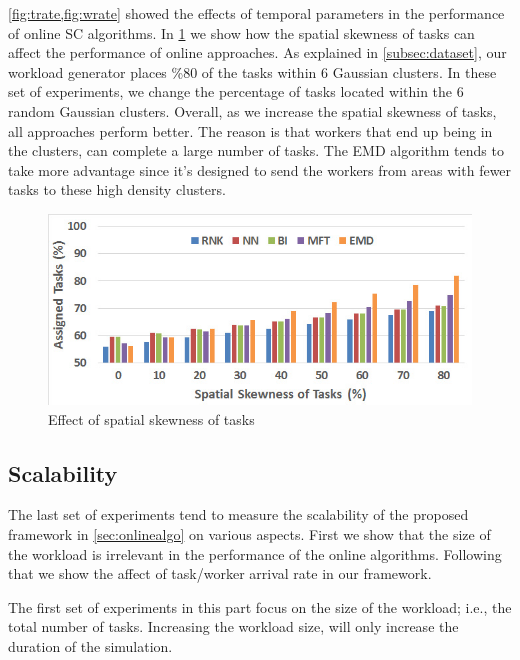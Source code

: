 \cref{fig:trate,fig:wrate} showed the effects of temporal parameters in the performance of online SC algorithms. In \cref{fig:skewness} we show how the spatial skewness of tasks can affect the performance of online approaches. As explained in \cref{subsec:dataset}, our workload generator places \%80 of the tasks within 6 Gaussian clusters. In these set of experiments, we change the percentage of tasks located within the 6 random Gaussian clusters. Overall, as we increase the spatial skewness of tasks, all approaches perform better. The reason is that workers that end up being in the clusters, can complete a large number of tasks. The EMD algorithm tends to take more advantage since it's designed to send the workers from areas with fewer tasks to these high density clusters.

\begin{figure}[h]
	\centering
	\includegraphics[width = 0.9\columnwidth]{figures/accuracy_skewness.jpg}
	\vspace{-0.1in}
	\caption{Effect of spatial skewness of tasks}\label{fig:skewness}
\end{figure}

\subsection{Scalability}
The last set of experiments tend to measure the scalability of the proposed framework in \cref{sec:onlinealgo} on various aspects. First we show that the size of the workload is irrelevant in the performance of the online algorithms. Following that we show the affect of task/worker arrival rate in our framework.

The first set of experiments in this part focus on the size of the workload; i.e., the total number of tasks. Increasing the workload size, will only increase the duration of the simulation.


